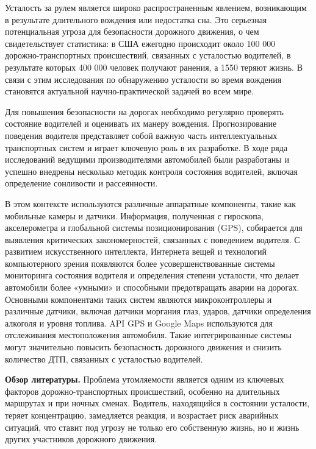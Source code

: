 Усталость за рулем является широко распространенным явлением,
возникающим в результате длительного вождения или недостатка сна. Это
серьезная потенциальная угроза для безопасности дорожного движения, о
чем свидетельствует статистика: в США ежегодно происходит около 100 000
дорожно-транспортных происшествий, связанных с усталостью водителей, в
результате которых 400 000 человек получают ранения, а 1550 теряют
жизнь. В связи с этим исследования по обнаружению усталости во время
вождения становятся актуальной научно-практической задачей во всем мире.

Для повышения безопасности на дорогах необходимо регулярно проверять
состояние водителей и оценивать их манеру вождения. Прогнозирование
поведения водителя представляет собой важную часть интеллектуальных
транспортных систем и играет ключевую роль в их разработке. В ходе ряда
исследований ведущими производителями автомобилей были разработаны и
успешно внедрены несколько методик контроля состояния водителей, включая
определение сонливости и рассеянности.

В этом контексте используются различные аппаратные компоненты, такие как
мобильные камеры и датчики. Информация, полученная с гироскопа,
акселерометра и глобальной системы позиционирования (GPS), собирается
для выявления критических закономерностей, связанных с поведением
водителя. С развитием искусственного интеллекта, Интернета вещей и
технологий компьютерного зрения появляются более усовершенствованные
системы мониторинга состояния водителя и определения степени усталости,
что делает автомобили более «умными» и способными предотвращать аварии
на дорогах. Основными компонентами таких систем являются
микроконтроллеры и различные датчики, включая датчики моргания глаз,
ударов, датчики определения алкоголя и уровня топлива. API GPS и Google
Maps используются для отслеживания местоположения автомобиля. Такие
интегрированные системы могут значительно повысить безопасность
дорожного движения и снизить количество ДТП, связанных с усталостью
водителей.

{\bfseries Обзор литературы.} Проблема утомляемости является одним из
ключевых факторов дорожно-транспортных происшествий, особенно на
длительных маршрутах и при ночных сменах. Водитель, находящийся в
состоянии усталости, теряет концентрацию, замедляется реакция, и
возрастает риск аварийных ситуаций, что ставит под угрозу не только его
собственную жизнь, но и жизнь других участников дорожного движения.

